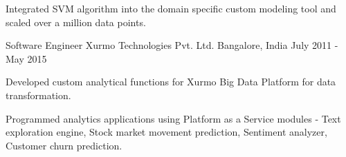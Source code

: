 \begin{cventries}
{\begin{cvitems}
        \item {Integrated SVM algorithm into the domain specific custom modeling tool and scaled over a million data points.}
      \end{cvitems}
    }
  \cventry
    {Software Engineer}
    {Xurmo Technologies Pvt. Ltd.}
    {Bangalore, India}
    {July 2011 - May 2015}
    {
      \begin{cvitems}
        \item {Developed custom analytical functions for Xurmo Big Data Platform for data transformation.}
        \item {Programmed analytics applications using Platform as a Service modules - Text exploration engine, Stock market movement prediction, Sentiment analyzer, Customer churn prediction.}
      \end{cvitems} 
    }
\end{cventries}
